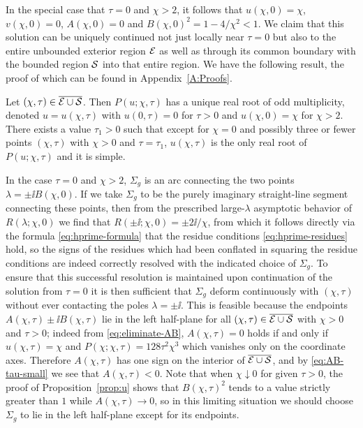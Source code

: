 In the special case that $\tau=0$ and $\chi>2$, it follows that $u(\chi,0)=\chi$, $v(\chi,0)=0$, $A(\chi,0)=0$ and $B(\chi,0)^2=1-4/\chi^2<1$.
We claim that this solution can be uniquely continued not just locally near $\tau=0$ but also to the entire unbounded exterior region $\mathcal{E}$ as well as through its common boundary with the bounded region $\mathcal{S}$ into that entire region.  We have the following result, the proof of which can be found in Appendix~\ref{A:Proofs}.
\begin{proposition}
Let $(\chi,\tau)\in \overline{\mathcal{E}\cup\mathcal{S}}$.  Then $P(u;\chi,\tau)$ has a unique real root of odd multiplicity, denoted $u=u(\chi,\tau)$ with $u(0,\tau)=0$ for $\tau>0$ and $u(\chi,0)=\chi$ for $\chi>2$.  There exists a value $\tau_1>0$ such that except for $\chi=0$ and possibly three or fewer points $(\chi,\tau)$ with $\chi>0$ and $\tau=\tau_1$, $u(\chi,\tau)$ is the only real root of $P(u;\chi,\tau)$ and it is simple.  
\label{prop:u}
\end{proposition}

\begin{remark}
In the case $\tau=0$ and $\chi>2$, $\Sigma_g$ is an arc connecting the two points $\lambda=\pm\ii B(\chi,0)$.  If we take $\Sigma_g$ to be the purely imaginary straight-line segment connecting these points, then from the prescribed large-$\lambda$ asymptotic behavior of $R(\lambda;\chi,0)$ we find that $R(\pm\ii;\chi,0)=\pm 2\ii/\chi$, from which it follows directly via the formula \eqref{eq:hprime-formula} that the residue conditions \eqref{eq:hprime-residues} hold, so the signs of the residues which had been conflated in squaring the residue conditions are indeed correctly resolved with the indicated choice of $\Sigma_g$.  To ensure that this successful resolution is maintained upon continuation of the solution from $\tau=0$ it is then sufficient that $\Sigma_g$ deform continuously with $(\chi,\tau)$ without ever contacting the poles $\lambda=\pm\ii$.  This is feasible because the endpoints $A(\chi,\tau)\pm\ii B(\chi,\tau)$ lie in the left half-plane for all $(\chi,\tau)\in\overline{\mathcal{E}\cup\mathcal{S}}$ with $\chi>0$ and $\tau>0$; indeed from \eqref{eq:eliminate-AB}, $A(\chi,\tau)=0$ holds if and only if $u(\chi,\tau)=\chi$ and $P(\chi;\chi,\tau)=128\tau^2\chi^3$ which vanishes only on the coordinate axes.  Therefore $A(\chi,\tau)$ has one sign on the interior of $\overline{\mathcal{E}\cup\mathcal{S}}$, and by \eqref{eq:AB-tau-small} we see that $A(\chi,\tau)<0$.  Note that when $\chi\downarrow 0$ for given $\tau>0$, the proof of Proposition~\ref{prop:u} shows that $B(\chi,\tau)^2$ tends to a value strictly greater than $1$ while $A(\chi,\tau)\to 0$, so in this limiting situation we should choose $\Sigma_g$ to lie in the left half-plane except for its endpoints.
\label{rem:Sigma_g}
\end{remark}

